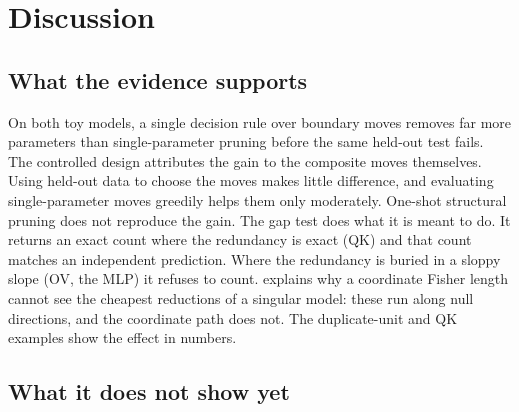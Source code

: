 \documentclass[11pt,a4paper]{article}
\theoremstyle{definition}
\begin{document}
\section{Discussion}
\label{sec:discussion}

\subsection{What the evidence supports}

On both toy models, a single decision rule over boundary moves removes far more
parameters than single-parameter pruning before the same held-out test fails. The
controlled design attributes the gain to the composite moves themselves. Using
held-out data to choose the moves makes little difference, and evaluating
single-parameter moves greedily helps them only moderately. One-shot structural pruning
does not reproduce the gain. The gap test does what it is meant to do. It returns an
exact count where the redundancy is exact (QK) and that count matches an independent
prediction. Where the redundancy is buried in a sloppy slope (OV, the MLP) it refuses to
count.  explains why a coordinate Fisher length cannot see the
cheapest reductions of a singular model: these run along null directions, and the
coordinate path does not. The duplicate-unit and QK examples show the effect in
numbers.

\subsection{What it does not show yet}
\label{sec:threats}
\end{document}
